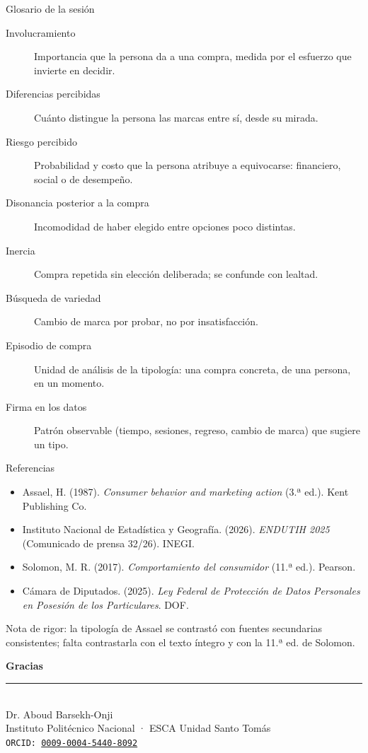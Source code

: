 \documentclass[aspectratio=169,xcolor=dvipsnames]{beamer}
\begin{document}
\begin{frame}{Glosario de la sesión}
\scriptsize
\begin{description}
  \item[Involucramiento] Importancia que la persona da a una compra, medida por el esfuerzo que invierte en decidir.
  \item[Diferencias percibidas] Cuánto distingue la persona las marcas entre sí, desde su mirada.
  \item[Riesgo percibido] Probabilidad y costo que la persona atribuye a equivocarse: financiero, social o de desempeño.
  \item[Disonancia posterior a la compra] Incomodidad de haber elegido entre opciones poco distintas.
  \item[Inercia] Compra repetida sin elección deliberada; se confunde con lealtad.
  \item[Búsqueda de variedad] Cambio de marca por probar, no por insatisfacción.
  \item[Episodio de compra] Unidad de análisis de la tipología: una compra concreta, de una persona, en un momento.
  \item[Firma en los datos] Patrón observable (tiempo, sesiones, regreso, cambio de marca) que sugiere un tipo.
\end{description}
\end{frame}

\begin{frame}{Referencias}
\tiny
\begin{itemize}
  \item[] Assael, H. (1987). \textit{Consumer behavior and marketing action} (3.ª ed.). Kent Publishing Co.
  \item[] Instituto Nacional de Estadística y Geografía. (2026). \textit{ENDUTIH 2025} (Comunicado de prensa 32/26). INEGI.
  \item[] Solomon, M. R. (2017). \textit{Comportamiento del consumidor} (11.ª ed.). Pearson.
  \item[] Cámara de Diputados. (2025). \textit{Ley Federal de Protección de Datos Personales en Posesión de los Particulares}. DOF.
\end{itemize}
\vspace{4pt}
{\scriptsize Nota de rigor: la tipología de Assael se contrastó con fuentes secundarias consistentes; falta contrastarla con el texto íntegro y con la 11.ª ed. de Solomon.}
\end{frame}

\begin{frame}
    \begin{center}
        {\Large \textcolor{IPNguinda}{\textbf{Gracias}}}\\[6pt]
        {\color{IPNdorado}\rule{0.4\linewidth}{1.2pt}}\\[6pt]
        Dr. Aboud Barsekh-Onji \\
        \small Instituto Politécnico Nacional · ESCA Unidad Santo Tomás \\
        \small \texttt{ORCID: \href{https://orcid.org/0009-0004-5440-8092}{0009-0004-5440-8092}}
    \end{center}
\end{frame}
\end{document}
